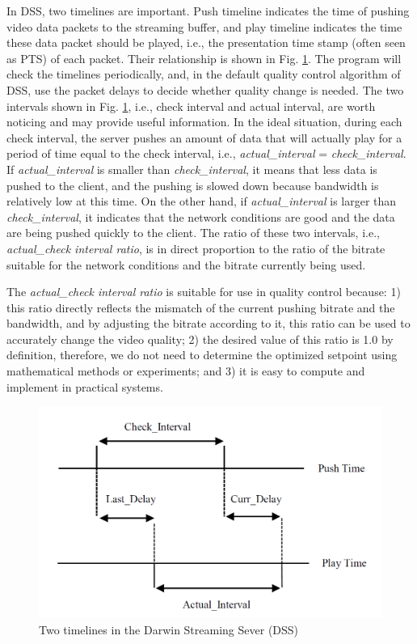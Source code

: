 \documentclass[journal]{IEEEtran}
\begin{document}
In DSS, two timelines are important. Push timeline indicates the time of pushing video data packets to the streaming buffer, and play timeline indicates the time these data packet should be played, i.e., the presentation time stamp (often seen as PTS) of each packet. Their relationship is shown in Fig. \ref{fig:intervals}. The program will check the timelines periodically, and, in the default quality control algorithm of DSS, use the packet delays to decide whether quality change is needed. The two intervals shown in Fig. \ref{fig:intervals}, i.e., check interval and actual interval, are worth noticing and may provide useful information. In the ideal situation, during each check interval, the server pushes an amount of data that will actually play for a period of time equal to the check interval, i.e., \textit{actual\_interval} = \textit{check\_interval}. If \textit{actual\_interval} is smaller than \textit{check\_interval}, it means that less data is pushed to the client, and the pushing is slowed down because bandwidth is relatively low at this time. On the other hand, if \textit{actual\_interval} is larger than \textit{check\_interval}, it indicates that the network conditions are good and the data are being pushed quickly to the client. The ratio of these two intervals, i.e., \textit{actual\_check interval ratio}, is in direct proportion to the ratio of the bitrate suitable for the network conditions and the bitrate currently being used.

The \textit{actual\_check interval ratio} is suitable for use in quality control because: 1) this ratio directly reflects the mismatch of the current pushing bitrate and the bandwidth, and by adjusting the bitrate according to it, this ratio can be used to accurately change the video quality; 2) the desired value of this ratio is 1.0 by definition, therefore, we do not need to determine the optimized setpoint using mathematical methods or experiments; and 3) it is easy to compute and implement in practical systems.

\begin{figure}[t]
\centering
\includegraphics[width = 0.9\linewidth]{Intervals.png}
\caption{Two timelines in the Darwin Streaming Sever (DSS) \label{fig:intervals}}
\end{figure}
\end{document}
